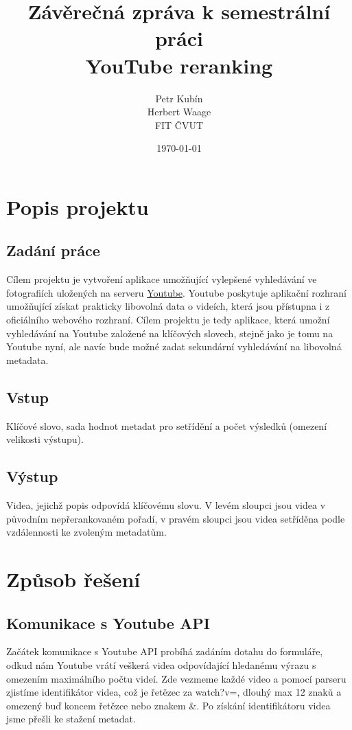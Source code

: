 \documentclass[a4paper,11pt]{article}
\title{Závěrečná zpráva k semestrální práci\\
		YouTube reranking\\}
\author{Petr Kubín\\
Herbert Waage\\
FIT ČVUT\\}
\date{\today}
\begin{document}
\maketitle
\newpage

\tableofcontents
\newpage

\section{Popis projektu}
\subsection{Zadání práce}
\par{Cílem projektu je vytvoření aplikace umožňující vylepšené vyhledávání ve fotografiích uložených na serveru \href{www.youtube.com}{Youtube}. Youtube poskytuje aplikační rozhraní umožňující získat prakticky libovolná data o videích, která jsou
přístupna i z oficiálního webového rozhraní. Cílem projektu je tedy aplikace, která umožní vyhledávání na
Youtube založené na klíčových slovech, stejně jako je tomu na Youtube nyní, ale navíc bude možné zadat
sekundární vyhledávání na libovolná metadata.}
\subsection{Vstup}
\par{Klíčové slovo, sada hodnot metadat pro setřídění a počet výsledků (omezení velikosti výstupu).}
\subsection{Výstup}
\par{Videa, jejichž popis odpovídá klíčovému slovu. V levém sloupci jsou videa v původním nepřerankovaném pořadí, v pravém sloupci jsou videa setříděna podle vzdálennosti ke zvoleným metadatům.}

\section{Způsob řešení}
\subsection{Komunikace s Youtube API}
\par Začátek komunikace s Youtube API probíhá zadáním dotahu do formuláře, odkud nám Youtube vrátí veškerá videa odpovídající hledanému výrazu s omezením maximálního počtu videí. Zde vezmeme každé video a pomocí parseru zjistíme identifikátor videa, což je řetězec za watch?v=, dlouhý max 12 znaků a omezený buď koncem řetězce nebo znakem \&. Po získání identifikátoru videa jsme přešli ke stažení metadat. 
\end{document}
